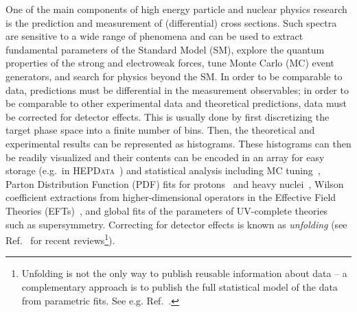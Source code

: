 \documentclass[a4paper,11pt]{article}
\begin{document}
One of the main components of high energy particle and nuclear physics research is the prediction and measurement of (differential) cross sections.  Such spectra are sensitive to a wide range of phenomena and can be used to extract fundamental parameters of the Standard Model (SM), explore the quantum properties of the strong and electroweak forces, tune Monte Carlo (MC) event generators, and search for physics beyond the SM.  In order to be comparable to data, predictions must be differential in the measurement observables; in order to be comparable to other experimental data and theoretical predictions, data must be corrected for detector effects.  This is usually done by first discretizing the target phase space into a finite number of bins.  Then, the theoretical and experimental results can be represented as histograms.  These histograms can then be readily visualized and their contents can be encoded in an array for easy storage (e.g.\ in \textsc{HEPData}~\cite{Maguire:2017ypu}) and statistical analysis including MC tuning~\cite{Buckley:2009bj}, Parton Distribution Function (PDF) fits for protons~\cite{Gao:2017yyd} and heavy nuclei~\cite{AbdulKhalek:2020yuc}, Wilson coefficient extractions from higher-dimensional
	operators in the Effective
	Field Theories (EFTs)~\cite{Brivio:2017vri, Biekoetter:2018ypq,daSilvaAlmeida:2018iqo,Brivio:2019ius, Dawson:2020oco, Ellis:2020unq, Ethier:2021ydt, Ethier:2021bye, Brivio:2021alv, Almeida:2021asy}, %
	and global fits of the parameters of UV-complete theories~\cite{GAMBIT:2017snp,Bagnaschi:2015eha} such as supersymmetry.
%
Correcting for detector effects is known as \textit{unfolding} (see Ref.~\cite{Cowan:2002in,Blobel:2203257,doi:10.1002/9783527653416.ch6,Balasubramanian:2019itp} for recent reviews\footnote{Unfolding is not the only way to publish reusable information about data -- a complementary approach is to publish the full statistical model of the data from parametric fits.  See e.g. Ref.~\cite{2109.04981}.}).
\end{document}
